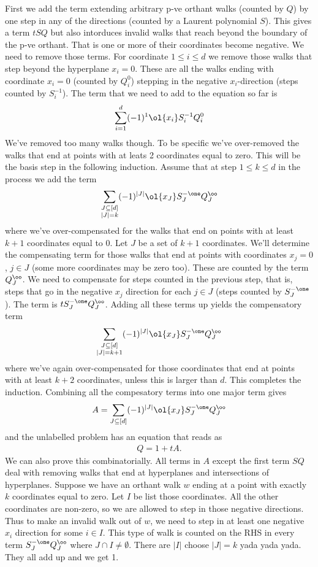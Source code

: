 First we add the term extending arbitrary p-ve orthant walks (counted by $Q$) by one step in any of the directions (counted by a Laurent polynomial $S$). This gives a term $tSQ$ but also intorduces invalid walks that reach beyond the boundary of the p-ve orthant. That is one or more of their coordinates become negative. We need to remove those terms. For coordinate $1\leq i \leq d$ we remove those walks that step beyond the hyperplane $x_i = 0$. These are all the walks ending with coordinate $x_i = 0$ (counted by $Q_i^0$) stepping in the negative $x_i$-direction (steps counted by $S_i^{-1}$). The term that we need to add to the equation so far is
\[
	\sum_{i=1}^d (-1)^1\ol{x_i}S_i^{-1}Q_i^0
\]
We've removed too many walks though. To be specific we've over-removed the walks that end at points with at leats 2 coordinates equal to zero. This will be the basis step in the following induction. Assume that at step $1\leq k \leq d$ in the process we add the term
\[
	\sum_{\substack{J\subseteq [d]\\|J|=k}}(-1)^{|J|} \ol{x_J}S_{J}^{-\one}Q_{J}^{\oo}
\]
where we've over-compensated for the walks that end on points with at least $k+1$ coordinates equal to 0. Let $J$ be a set of $k+1$ coordinates. We'll determine the compensating term for those walks that end at points with coordinates $x_j = 0$, $j\in J$ (some more coordinates may be zero too). These are counted by the term $Q_J^\oo$. We need to compensate for steps counted in the previous step, that is, steps that go in the negative $x_j$ direction for each $j\in J$ (steps counted by $S_J^{-\one}$). The term is $tS_J^{-\one}Q_J^\oo$. Adding all these terms up yields the compensatory term
\[
	\sum_{\substack{J\subseteq [d]\\|J|=k+1}}(-1)^{|J|} \ol{x_J}S_{J}^{-\one}Q_{J}^{\oo}
\]
where we've again over-compensated for those coordinates that end at points with at least $k+2$ coordinates, unless this is larger than $d$. This completes the induction. Combining all the compesatory terms into one major term gives
\[
     A = \sum_{J\subseteq [d]}(-1)^{|J|} \ol{x_J}S_{J}^{-\one}Q_{J}^{\oo}
\]
and the unlabelled problem has an equation that reads as
\begin{align}
     Q = 1 + tA.
\end{align}
We can also prove this combinatorially. All terms in $A$ except the first term $SQ$ deal with removing walks that end at hyperplanes and intersections of hyperplanes. Suppose we have an orthant walk $w$ ending at a point with exactly $k$ coordinates equal to zero. Let $I$ be list those coordinates. All the other coordinates are non-zero, so we are allowed to step in those negative directions. Thus to make an invalid walk out of $w$, we need to step in at least one negative $x_i$ direction for some $i \in I$. This type of walk is counted on the RHS in every term $S_J^{-\one}Q_J^\oo$ where $J\cap I \neq \emptyset$. There are $|I|$ choose $|J| = k$ yada yada yada. They all add up and we get 1.

